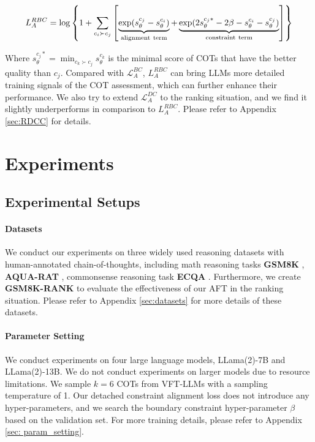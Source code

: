 \begin{equation}
    {L}_A^{RBC} = \log\left\{1 + \sum_{c_i \succ c_j } \left[\underbrace{\exp(s_{\theta}^{c_j} - s_{\theta}^{c_i})}_{\rm alignment \ term} + \underbrace{\exp(2s^{c_j*}_{\theta} - 2\beta -  s^{c_i}_{\theta} - s_{\theta}^{c_j})}_{\rm constraint \ term}\right]\right\}
    \label{eq:rBCA}
\end{equation}

Where $s^{c_j*}_{\theta} = \min_{c_k \succ c_j} s_{\theta}^{c_k}$ is the minimal score of COTs that have the better quality than $c_j$. Compared with $\mathcal{L}_A^{BC}$, ${L}_A^{RBC}$ can bring LLMs more detailed training signals of the COT assessment, which can further enhance their performance. We also try to extend $\mathcal{L}^{DC}_A$ to the ranking situation, and we find it slightly underperforms in comparison to ${L}_A^{RBC}$. Please refer to Appendix \ref{sec:RDCC} for details.

\section{Experiments}
\subsection{Experimental Setups}
\paragraph{Datasets}
We conduct our experiments on three widely used reasoning datasets with human-annotated chain-of-thoughts, including math reasoning tasks \textbf{GSM8K} \citep{gsm8k}, \textbf{AQUA-RAT} \citep{aqua}, commonsense reasoning task \textbf{ECQA} \citep{ecqa}. Furthermore, we create \textbf{GSM8K-RANK} to evaluate the effectiveness of our AFT in the ranking situation. Please refer to Appendix \ref{sec:datasets} for more details of these datasets.

\paragraph{Parameter Setting}
\label{sec:param}
We conduct experiments on four large language models, LLama(2)-7B and LLama(2)-13B. We do not conduct experiments on larger models due to resource limitations. We sample $k=6$ COTs from VFT-LLMs with a sampling temperature of 1. Our detached constraint alignment loss does not introduce any hyper-parameters, and we search the boundary constraint hyper-parameter $\beta$ based on the validation set. For more training details, please refer to Appendix \ref{sec: param_setting}.

